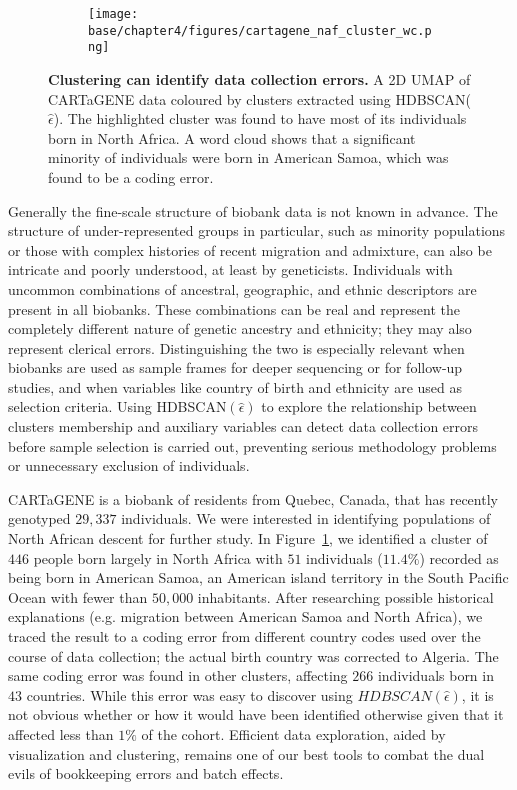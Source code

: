 \begin{figure}[ht]
  \centering
  \begin{subfigure}[b]{0.95\linewidth}
  \texttt{[image: base/chapter4/figures/cartagene\_naf\_cluster\_wc.png]}
  \end{subfigure}
  \caption[Clustering identifies data collection errors in CaG]{\textbf{Clustering can identify data collection errors.} A 2D UMAP of CARTaGENE data coloured by clusters extracted using HDBSCAN($\hat{\epsilon}$). The highlighted cluster was found to have most of its individuals born in North Africa. A word cloud shows that a significant minority of individuals were born in American Samoa, which was found to be a coding error.}
    \label{fig:ctg}
\end{figure}

Generally the fine-scale structure of biobank data is not known in advance. The structure of under-represented groups in particular, such as minority populations or those with complex histories of recent migration and admixture, can also be intricate and poorly understood, at least by geneticists. Individuals with uncommon combinations of ancestral, geographic, and ethnic descriptors are present in all biobanks. These combinations can be real and represent the completely different nature of genetic ancestry and ethnicity; they may also represent clerical errors\citep{macleod_principles_2009}. Distinguishing the two is especially relevant when biobanks are used as sample frames for deeper sequencing or for follow-up studies, and when variables like country of birth and ethnicity are used as selection criteria. Using HDBSCAN$(\hat{\epsilon})$ to explore the relationship between clusters membership and auxiliary variables can detect data collection errors before sample selection is carried out, preventing serious methodology problems or unnecessary exclusion of individuals.

CARTaGENE is a biobank of residents from Quebec, Canada, that has recently genotyped $29,337$ individuals\citep{awadalla_cohort_2013}. We were interested in identifying populations of North African descent for further study. In Figure~\ref{fig:ctg}, we identified a cluster of $446$ people born largely in North Africa with $51$ individuals ($11.4\%$) recorded as being born in American Samoa, an American island territory in the South Pacific Ocean with fewer than $50,000$ inhabitants. After researching possible historical explanations (e.g. migration between American Samoa and North Africa), we traced the result to a coding error from different country codes used over the course of data collection; the actual birth country was corrected to Algeria. The same coding error was found in other clusters, affecting $266$ individuals born in $43$ countries. While this error was easy to discover using $HDBSCAN(\hat{\epsilon})$, it is not obvious whether or how it would have been identified otherwise given that it affected less than $1\%$ of the cohort. Efficient data exploration, aided by visualization and clustering, remains one of our best tools to combat the dual evils of bookkeeping errors and batch effects.

